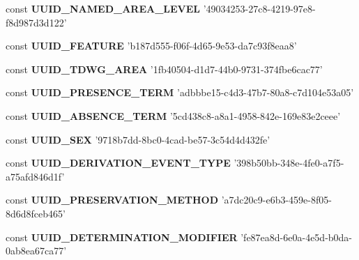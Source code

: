 \begin{DoxyCompactItemize}
\item 
\hypertarget{uuids_8php_af7325314223ec0dcf742cb22da8e3e07}{const {\bfseries U\-U\-I\-D\-\_\-\-N\-A\-M\-E\-D\-\_\-\-A\-R\-E\-A\-\_\-\-L\-E\-V\-E\-L} '49034253-\/27c8-\/4219-\/97e8-\/f8d987d3d122'}\label{uuids_8php_af7325314223ec0dcf742cb22da8e3e07}

\item 
\hypertarget{uuids_8php_aecdeeebe21c6d9c122e35f6ec65b6c6b}{const {\bfseries U\-U\-I\-D\-\_\-\-F\-E\-A\-T\-U\-R\-E} 'b187d555-\/f06f-\/4d65-\/9e53-\/da7c93f8eaa8'}\label{uuids_8php_aecdeeebe21c6d9c122e35f6ec65b6c6b}

\item 
\hypertarget{uuids_8php_ada7dd5d8f3ff9b2335d88d87d015e746}{const {\bfseries U\-U\-I\-D\-\_\-\-T\-D\-W\-G\-\_\-\-A\-R\-E\-A} '1fb40504-\/d1d7-\/44b0-\/9731-\/374fbe6cac77'}\label{uuids_8php_ada7dd5d8f3ff9b2335d88d87d015e746}

\item 
\hypertarget{uuids_8php_a9fe6de3874092ad44555480cdcf0038f}{const {\bfseries U\-U\-I\-D\-\_\-\-P\-R\-E\-S\-E\-N\-C\-E\-\_\-\-T\-E\-R\-M} 'adbbbe15-\/c4d3-\/47b7-\/80a8-\/c7d104e53a05'}\label{uuids_8php_a9fe6de3874092ad44555480cdcf0038f}

\item 
\hypertarget{uuids_8php_a7029bde1ea252ec6938007a6c08d5c5f}{const {\bfseries U\-U\-I\-D\-\_\-\-A\-B\-S\-E\-N\-C\-E\-\_\-\-T\-E\-R\-M} '5cd438c8-\/a8a1-\/4958-\/842e-\/169e83e2ceee'}\label{uuids_8php_a7029bde1ea252ec6938007a6c08d5c5f}

\item 
\hypertarget{uuids_8php_a25c833afabc0592f1472da5249fd88ef}{const {\bfseries U\-U\-I\-D\-\_\-\-S\-E\-X} '9718b7dd-\/8bc0-\/4cad-\/be57-\/3c54d4d432fe'}\label{uuids_8php_a25c833afabc0592f1472da5249fd88ef}

\item 
\hypertarget{uuids_8php_a38d1c8ec03a9a9b4df2dac97c120598c}{const {\bfseries U\-U\-I\-D\-\_\-\-D\-E\-R\-I\-V\-A\-T\-I\-O\-N\-\_\-\-E\-V\-E\-N\-T\-\_\-\-T\-Y\-P\-E} '398b50bb-\/348e-\/4fe0-\/a7f5-\/a75afd846d1f'}\label{uuids_8php_a38d1c8ec03a9a9b4df2dac97c120598c}

\item 
\hypertarget{uuids_8php_a834f8bdd418c56727728ae8978ce3661}{const {\bfseries U\-U\-I\-D\-\_\-\-P\-R\-E\-S\-E\-R\-V\-A\-T\-I\-O\-N\-\_\-\-M\-E\-T\-H\-O\-D} 'a7dc20c9-\/e6b3-\/459e-\/8f05-\/8d6d8fceb465'}\label{uuids_8php_a834f8bdd418c56727728ae8978ce3661}

\item 
\hypertarget{uuids_8php_a3d1073720626440305a94a8f5091bba1}{const {\bfseries U\-U\-I\-D\-\_\-\-D\-E\-T\-E\-R\-M\-I\-N\-A\-T\-I\-O\-N\-\_\-\-M\-O\-D\-I\-F\-I\-E\-R} 'fe87ea8d-\/6e0a-\/4e5d-\/b0da-\/0ab8ea67ca77'}\label{uuids_8php_a3d1073720626440305a94a8f5091bba1}


\end{DoxyCompactItemize}
